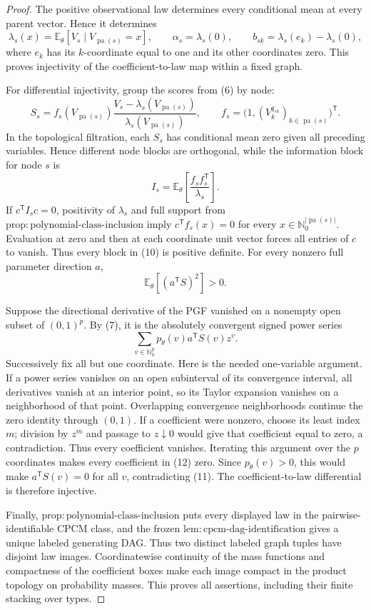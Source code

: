\documentclass{article}
\begin{document}
\begin{proof}
The positive observational law determines every conditional mean at every parent vector.  Hence it determines
\[
 \lambda_s(x)=\mathbb E_\theta[V_s\mid V_{\operatorname{pa}(s)}=x],
 \qquad
 \alpha_s=\lambda_s(0),
 \qquad
 b_{sk}=\lambda_s(e_k)-\lambda_s(0), \tag{8}
\]
where \(e_k\) has its \(k\)-coordinate equal to one and its other coordinates zero.  This proves injectivity of the coefficient-to-law map within a fixed graph.

For differential injectivity, group the scores from (6) by node:
\[
 S_s=f_s(V_{\operatorname{pa}(s)})
 \frac{V_s-\lambda_s(V_{\operatorname{pa}(s)})}
 {\lambda_s(V_{\operatorname{pa}(s)})},
 \qquad
 f_s=\bigl(1,(V_k^{q_{sk}})_{k\in\operatorname{pa}(s)}\bigr)^{\mathsf T}. \tag{9}
\]
In the topological filtration, each \(S_s\) has conditional mean zero given all preceding variables.  Hence different node blocks are orthogonal, while the information block for node \(s\) is
\[
 I_s=\mathbb E_\theta\!\left[\frac{f_sf_s^{\mathsf T}}{\lambda_s}\right]. \tag{10}
\]
If \(c^{\mathsf T}I_sc=0\), positivity of \(\lambda_s\) and full support from \(\mathrm{prop{:}polynomial\text{-}class\text{-}inclusion}\) imply \(c^{\mathsf T}f_s(x)=0\) for every \(x\in\mathbb N_0^{|\operatorname{pa}(s)|}\).  Evaluation at zero and then at each coordinate unit vector forces all entries of \(c\) to vanish.  Thus every block in (10) is positive definite.  For every nonzero full parameter direction \(a\),
\[
 \mathbb E_\theta[(a^{\mathsf T}S)^2]>0. \tag{11}
\]

Suppose the directional derivative of the PGF vanished on a nonempty open subset of \((0,1)^p\).  By (7), it is the absolutely convergent signed power series
\[
 \sum_{v\in\mathbb N_0^p}p_\theta(v)a^{\mathsf T}S(v)z^v. \tag{12}
\]
Successively fix all but one coordinate.  Here is the needed one-variable argument.  If a power series vanishes on an open subinterval of its convergence interval, all derivatives vanish at an interior point, so its Taylor expansion vanishes on a neighborhood of that point.  Overlapping convergence neighborhoods continue the zero identity through \((0,1)\).  If a coefficient were nonzero, choose its least index \(m\); division by \(z^m\) and passage to \(z\downarrow0\) would give that coefficient equal to zero, a contradiction.  Thus every coefficient vanishes.  Iterating this argument over the \(p\) coordinates makes every coefficient in (12) zero.  Since \(p_\theta(v)>0\), this would make \(a^{\mathsf T}S(v)=0\) for all \(v\), contradicting (11).  The coefficient-to-law differential is therefore injective.

Finally, \(\mathrm{prop{:}polynomial\text{-}class\text{-}inclusion}\) puts every displayed law in the pairwise-identifiable CPCM class, and the frozen \(\mathrm{lem{:}cpcm\text{-}dag\text{-}identification}\) gives a unique labeled generating DAG.  Thus two distinct labeled graph tuples have disjoint law images.  Coordinatewise continuity of the mass functions and compactness of the coefficient boxes make each image compact in the product topology on probability masses.  This proves all assertions, including their finite stacking over types.
\end{proof}
\end{document}
